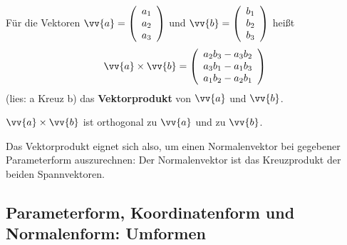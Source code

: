 \begin{definition}
    Für die Vektoren $\vv{a} = \left(\begin{array}{c}  a_1 \\ a_2 \\ a_3 \end{array}\right)$ und $\vv{b} = \left(\begin{array}{c}  b_1 \\ b_2 \\ b_3 \end{array}\right)$ heißt $$\vv{a} \times \vv{b} = \left(\begin{array}{c}  a_2b_3 - a_3b_2 \\ a_3b_1 - a_1b_3 \\ a_1b_2 - a_2b_1 \end{array}\right)$$ (lies: \glqq  a Kreuz b\grqq{}) das \textbf{Vektorprodukt} von $\vv{a}$ und $\vv{b}$.
\end{definition}
\begin{satz}
    $\vv{a} \times \vv{b}$ ist orthogonal zu $\vv{a}$ und zu $\vv{b}$.
\end{satz}

Das Vektorprodukt eignet sich also, um einen Normalenvektor bei gegebener Parameterform auszurechnen: Der Normalenvektor ist das Kreuzprodukt der beiden Spannvektoren.

\subsection{Parameterform, Koordinatenform und Normalenform: Umformen}

